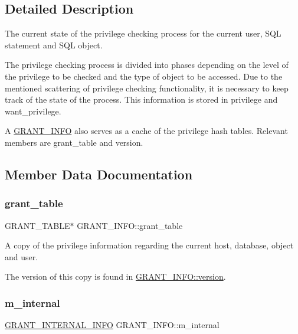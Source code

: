 \subsection{Detailed Description}
The current state of the privilege checking process for the current user, S\+QL statement and S\+QL object. 

The privilege checking process is divided into phases depending on the level of the privilege to be checked and the type of object to be accessed. Due to the mentioned scattering of privilege checking functionality, it is necessary to keep track of the state of the process. This information is stored in privilege and want\+\_\+privilege.

A \mbox{\hyperlink{structGRANT__INFO}{G\+R\+A\+N\+T\+\_\+\+I\+N\+FO}} also serves as a cache of the privilege hash tables. Relevant members are grant\+\_\+table and version. 

\subsection{Member Data Documentation}
\mbox{\label{structGRANT__INFO_a25c6b4e6dd4a135f40d834c233655487}} 
\subsubsection{\texorpdfstring{grant\+\_\+table}{grant\_table}}
{\footnotesize\ttfamily G\+R\+A\+N\+T\+\_\+\+T\+A\+B\+LE$\ast$ G\+R\+A\+N\+T\+\_\+\+I\+N\+F\+O\+::grant\+\_\+table}



A copy of the privilege information regarding the current host, database, object and user. 

The version of this copy is found in \mbox{\hyperlink{structGRANT__INFO_a9fa219d89f9bbeca61f033a1d75c0ba2}{G\+R\+A\+N\+T\+\_\+\+I\+N\+F\+O\+::version}}. \mbox{\label{structGRANT__INFO_a03c3e3236b3f922a87836a625628a19f}} 
\subsubsection{\texorpdfstring{m\+\_\+internal}{m\_internal}}
{\footnotesize\ttfamily \mbox{\hyperlink{structst__grant__internal__info}{G\+R\+A\+N\+T\+\_\+\+I\+N\+T\+E\+R\+N\+A\+L\+\_\+\+I\+N\+FO}} G\+R\+A\+N\+T\+\_\+\+I\+N\+F\+O\+::m\+\_\+internal}

